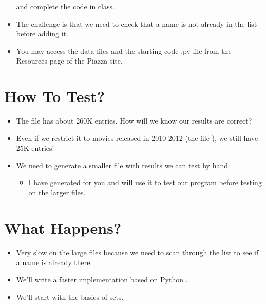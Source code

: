 \documentclass[letterpaper,10pt,english]{sphinxmanual}
\begin{document}
\begin{itemize}
and complete the code in class.

\item {} 
The challenge is that we need to check that a name is not already in
the list before adding it.

\item {} 
You may access the data files and the starting code .py file from
the Resources page of the Piazza site.

\end{itemize}


\section{How To Test?}
\label{\detokenize{lecture_notes/lec15_sets:how-to-test}}\begin{itemize}
\item {} 
The file  has about 260K entries. How will we know
our results are correct?

\item {} 
Even if we restrict it to movies released in 2010-2012 (the file
), we still have 25K entries!

\item {} 
We need to generate a smaller file with results we can test by hand
\begin{itemize}
\item {} 
I have generated  for you and will use it to test our
program before testing on the larger files.

\end{itemize}

\end{itemize}


\section{What Happens?}
\label{\detokenize{lecture_notes/lec15_sets:what-happens}}\begin{itemize}
\item {} 
Very slow on the large files because we need to scan through the list
to see if a name is already there.

\item {} 
We’ll write a faster implementation based on Python .

\item {} 
We’ll start with the basics of sets.

\end{itemize}
\end{document}
